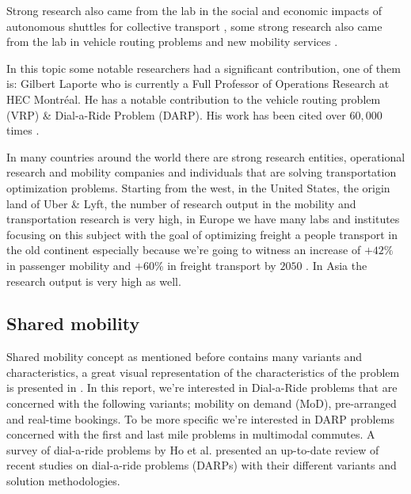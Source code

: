 \documentclass{article}
\begin{document}
Strong research also came from the lab in the social and economic impacts of autonomous shuttles for collective transport \cite{antonialli2019}, some strong research also came from the lab in vehicle routing problems and new mobility services \cite{VOSOOGHI201915}\cite{vosooghi2019}.

In this topic some notable researchers had a significant contribution, one of them is: Gilbert Laporte who is currently a Full Professor of Operations Research at HEC Montréal. He has a notable contribution to the vehicle routing problem (VRP) \& Dial-a-Ride Problem (DARP). His work has been cited over $60,000$ times \cite{gilbert_laporte_profile}.

In many countries around the world there are strong research entities, operational research and mobility companies and individuals that are solving transportation optimization problems. Starting from the west, in the United States, the origin land of Uber \& Lyft, the number of research output in the mobility and transportation research is very high, in Europe we have many labs and institutes focusing on this subject with the goal of optimizing freight a people transport in the old continent especially because we\rq{re} going to witness an increase of $+42\%$ in passenger mobility and $+60\%$ in freight transport by $2050$ \cite{report_EU_2050}. In Asia the research output is very high as well.




\subsection{Shared mobility}
\label{subsec:Shared_Mobility}

Shared mobility concept as mentioned before contains many variants and characteristics, a great visual representation of the characteristics of the problem is presented in \cite{MOURAD2019}. In this report, we\rq{re} interested in Dial-a-Ride problems that are concerned with the following variants; mobility on demand (MoD), pre-arranged and real-time bookings. To be more specific we\rq{re} interested in DARP problems concerned with the first and last mile problems in multimodal commutes. A survey of dial-a-ride problems by Ho et al. \cite{HO_darp2018} presented an up-to-date review of recent studies on dial-a-ride problems (DARPs) with their different variants and solution methodologies. 
\end{document}
